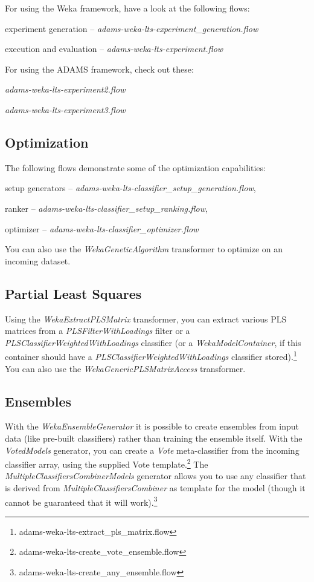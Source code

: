 For using the Weka framework, have a look at the following flows:
\begin{tight_itemize}
  \item experiment generation -- \textit{adams-weka-lts-experiment\_generation.flow}
  \item execution and evaluation -- \textit{adams-weka-lts-experiment.flow}
\end{tight_itemize}

For using the ADAMS framework, check out these:
\begin{tight_itemize}
  \item \textit{adams-weka-lts-experiment2.flow}
  \item \textit{adams-weka-lts-experiment3.flow}
\end{tight_itemize}

\subsection{Optimization}
The following flows demonstrate some of the optimization capabilities:
\begin{tight_itemize}
  \item setup generators -- \textit{adams-weka-lts-classifier\_setup\_generation.flow},
  \item ranker -- \textit{adams-weka-lts-classifier\_setup\_ranking.flow},
  \item optimizer -- \textit{adams-weka-lts-classifier\_optimizer.flow}
\end{tight_itemize}

You can also use the \textit{WekaGeneticAlgorithm} transformer to optimize on an incoming
dataset.

\subsection{Partial Least Squares}
Using the \textit{WekaExtractPLSMatrix} transformer, you can extract various
PLS matrices from a \textit{PLSFilterWithLoadings} filter or a 
\textit{PLSClassifierWeightedWithLoadings} classifier (or a \textit{WekaModelContainer},
if this container should have a \textit{PLSClassifierWeightedWithLoadings} classifier 
stored).\footnote{adams-weka-lts-extract\_pls\_matrix.flow}
You can also use the \textit{WekaGenericPLSMatrixAccess} transformer.

\subsection{Ensembles}
With the \textit{WekaEnsembleGenerator} it is possible to create ensembles from
input data (like pre-built classifiers) rather than training the ensemble itself.
With the \textit{VotedModels} generator, you can create a \textit{Vote}
meta-classifier from the incoming classifier array, using the supplied Vote 
template.\footnote{adams-weka-lts-create\_vote\_ensemble.flow}
The \textit{MultipleClassifiersCombinerModels} generator allows you to use
any classifier that is derived from \textit{MultipleClassifiersCombiner} as
template for the model (though it cannot be guaranteed that it will work).\footnote{adams-weka-lts-create\_any\_ensemble.flow}
  
